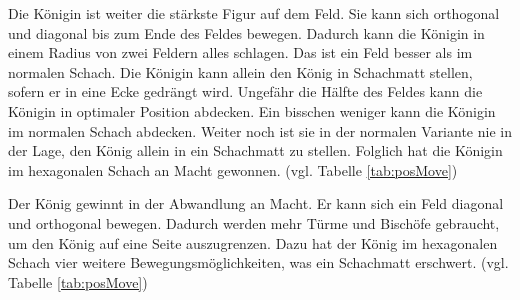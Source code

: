Die Königin ist weiter die stärkste Figur auf dem Feld. Sie kann sich orthogonal und diagonal bis zum Ende des Feldes bewegen. Dadurch kann die Königin in einem Radius von zwei Feldern alles schlagen. Das ist ein Feld besser als im normalen Schach. Die Königin kann allein den König in Schachmatt stellen, sofern er in eine Ecke gedrängt wird. Ungefähr die Hälfte des Feldes kann die Königin in optimaler Position abdecken. Ein bisschen weniger kann die Königin im normalen Schach abdecken. Weiter noch ist sie in der normalen Variante nie in der Lage, den König allein in ein Schachmatt zu stellen. Folglich hat die Königin im hexagonalen Schach an Macht gewonnen. \cite{GlinskiHexaChess} (vgl. Tabelle \ref{tab:posMove})\par
Der König gewinnt in der Abwandlung an Macht. Er kann sich ein Feld diagonal und orthogonal bewegen. Dadurch werden mehr Türme und Bischöfe gebraucht, um den König auf eine Seite auszugrenzen. Dazu hat der König im hexagonalen Schach vier weitere Bewegungsmöglichkeiten, was ein Schachmatt erschwert. \cite{GlinskiHexaChess} (vgl. Tabelle \ref{tab:posMove})
